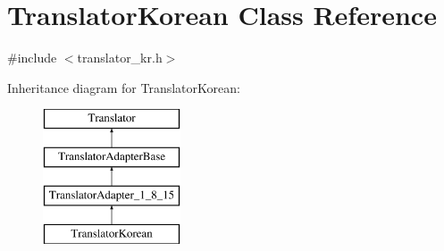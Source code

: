 \hypertarget{class_translator_korean}{}\section{Translator\+Korean Class Reference}
\label{class_translator_korean}


{\ttfamily \#include $<$translator\+\_\+kr.\+h$>$}

Inheritance diagram for Translator\+Korean\+:\begin{figure}[H]
\begin{center}
\leavevmode
\includegraphics[height=4.000000cm]{class_translator_korean}
\end{center}
\end{figure}
